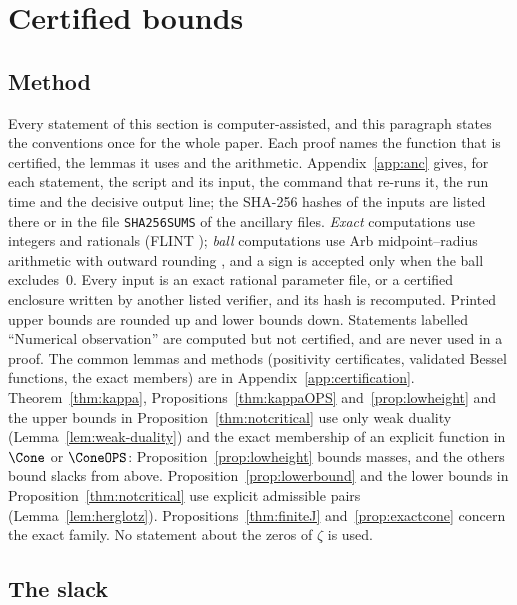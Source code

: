 \section{Certified bounds}\label{sec:certified}

\subsection{Method}\label{ssec:cert-method}

Every statement of this section is computer-assisted, and this paragraph states the conventions once for the whole paper. Each
proof names the function that is certified, the lemmas it uses and the arithmetic. Appendix~\ref{app:anc} gives, for each
statement, the script and its input, the command that re-runs it, the run time and the decisive output line; the SHA-256 hashes of
the inputs are listed there or in the file \texttt{SHA256SUMS} of the ancillary files. \emph{Exact} computations use integers and
rationals (FLINT \cite{FLINT}); \emph{ball} computations use Arb midpoint--radius arithmetic with outward rounding \cite{Joh17}, and a
sign is accepted only when the ball excludes~$0$. Every input is an exact rational parameter file, or a certified enclosure written by
another listed verifier, and its hash is recomputed. Printed upper bounds are rounded up and lower bounds down. Statements labelled ``Numerical observation'' are computed but
not certified, and are never used in a proof. The common lemmas and methods (positivity certificates, validated Bessel functions, the
exact members) are in Appendix~\ref{app:certification}. Theorem~\ref{thm:kappa}, Propositions~\ref{thm:kappaOPS}
and~\ref{prop:lowheight} and the upper bounds in Proposition~\ref{thm:notcritical} use only weak duality (Lemma~\ref{lem:weak-duality}) and
the exact membership of an explicit function in $\Cone$ or $\ConeOPS$: Proposition~\ref{prop:lowheight} bounds masses, and the others bound
slacks from above. Proposition~\ref{prop:lowerbound} and the lower bounds in Proposition~\ref{thm:notcritical} use explicit admissible pairs
(Lemma~\ref{lem:herglotz}). Propositions~\ref{thm:finiteJ} and~\ref{prop:exactcone} concern the exact family. No statement about the zeros of $\zeta$ is used.

\subsection{The slack}\label{ssec:kappa}

